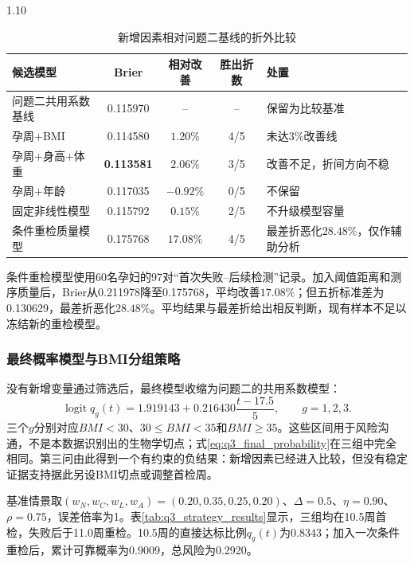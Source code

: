 \documentclass[12pt,a4paper]{ctexrep}
\numberwithin{equation}{section}
\begin{document}
\begin{spacing}{1.10}
{			\begin{table}[H]
			\centering
			\footnotesize
			\renewcommand{\arraystretch}{1.15}
			\caption{新增因素相对问题二基线的折外比较}
			\label{tab:q3_factor_results}
			\begin{tabularx}{\textwidth}{@{}p{}cccX@{}}
			\toprule
			候选模型 & Brier & 相对改善 & 胜出折数 & 处置 \\
			\midrule
			问题二共用系数基线 & 0.115970 & -- & -- & 保留为比较基准 \\
			孕周$+$BMI & 0.114580 & $1.20\%$ & 4/5 & 未达$3\%$改善线 \\
			孕周$+$身高$+$体重 & \textbf{0.113581} & \textbf{$2.06\%$} & 3/5 & 改善不足，折间方向不稳 \\
			孕周$+$年龄 & 0.117035 & $-0.92\%$ & 0/5 & 不保留 \\
			固定非线性模型 & 0.115792 & $0.15\%$ & 2/5 & 不升级模型容量 \\
			条件重检质量模型 & 0.175768 & $17.08\%$ & 4/5 & 最差折恶化$28.48\%$，仅作辅助分析 \\
			\bottomrule
			\end{tabularx}
			\end{table}

			条件重检模型使用60名孕妇的97对“首次失败--后续检测”记录。加入阈值距离和测序质量后，Brier从0.211978降至0.175768，平均改善$17.08\%$；但五折标准差为0.130629，最差折恶化$28.48\%$。平均结果与最差折给出相反判断，现有样本不足以冻结新的重检模型。

			\subsubsection{最终概率模型与BMI分组策略}
			没有新增变量通过筛选后，最终模型收缩为问题二的共用系数模型：
			\begin{equation}
			\operatorname{logit}q_g(t)
			=1.919143+0.216430\frac{t-17.5}{5},
			\qquad g=1,2,3.
			\label{eq:q3_final_probability}
			\end{equation}
			三个$g$分别对应$BMI<30$、$30\leq BMI<35$和$BMI\geq35$。这些区间用于风险沟通，不是本数据识别出的生物学切点；式\eqref{eq:q3_final_probability}在三组中完全相同。第三问由此得到一个有约束的负结果：新增因素已经进入比较，但没有稳定证据支持据此另设BMI切点或调整首检周。

			基准情景取$(w_N,w_C,w_L,w_A)=(0.20,0.35,0.25,0.20)$、$\Delta=0.5$、$\eta=0.90$、$\rho=0.75$，误差倍率为1。表\ref{tab:q3_strategy_results}显示，三组均在10.5周首检，失败后于11.0周重检。10.5周的直接达标比例$q_g(t)$为0.8343；加入一次条件重检后，累计可靠概率为0.9009，总风险为0.2920。

}
\end{spacing}
\end{document}
